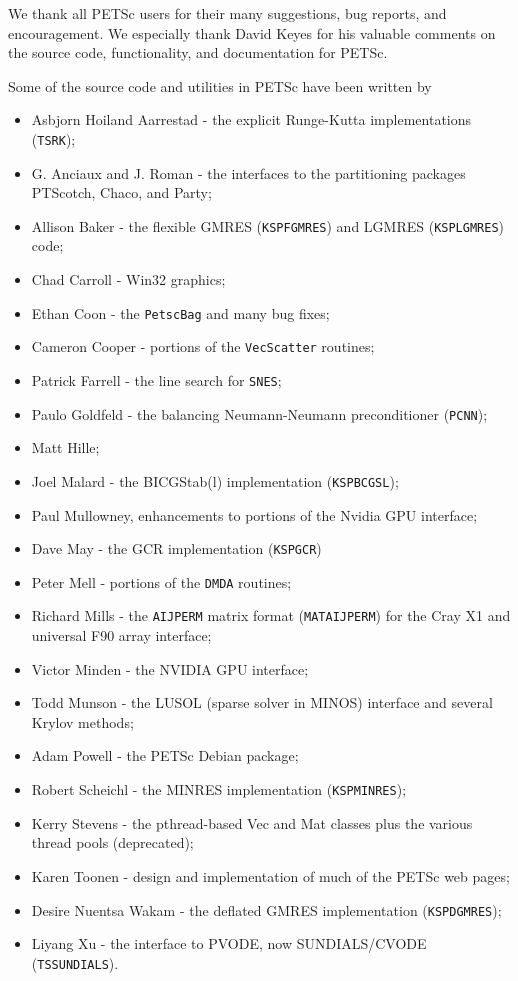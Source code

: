 %
%

\medskip \medskip \noindent
We thank all PETSc users for their many suggestions, bug reports, and
encouragement.  We especially thank David Keyes
for his valuable comments on the source code,
functionality, and documentation for PETSc.


\vspace{.3in}
\noindent
Some of the source code and utilities in PETSc
have been written by
\begin{itemize}
  \item Asbjorn Hoiland Aarrestad - the explicit Runge-Kutta implementations (\lstinline{TSRK});
  \item G. Anciaux and J. Roman - the interfaces to the partitioning packages PTScotch, Chaco, and Party;
  \item Allison Baker - the flexible GMRES (\lstinline{KSPFGMRES}) and LGMRES (\lstinline{KSPLGMRES}) code;
  \item Chad Carroll - Win32 graphics;
  \item Ethan Coon - the \lstinline{PetscBag} and many bug fixes;
  \item Cameron Cooper - portions of the \lstinline{VecScatter} routines;
  \item Patrick Farrell - the  line search for \lstinline{SNES};
  \item Paulo Goldfeld - the balancing Neumann-Neumann preconditioner (\lstinline{PCNN});
  \item Matt Hille;
  \item Joel Malard - the BICGStab(l) implementation (\lstinline{KSPBCGSL});
  \item Paul Mullowney, enhancements to portions of the Nvidia GPU interface;
  \item Dave May - the GCR implementation (\lstinline{KSPGCR})
  \item Peter Mell - portions of the \lstinline{DMDA} routines;
  \item Richard Mills - the \lstinline{AIJPERM} matrix format (\lstinline{MATAIJPERM}) for the Cray X1 and universal F90 array interface;
  \item Victor Minden - the NVIDIA GPU interface;
  \item Todd Munson - the LUSOL (sparse solver in MINOS) interface and several Krylov methods;
  \item Adam Powell - the PETSc Debian package;
  \item Robert Scheichl - the MINRES implementation (\lstinline{KSPMINRES});
  \item Kerry Stevens - the pthread-based Vec and Mat classes plus the various thread pools (deprecated);
  \item Karen Toonen - design and implementation of much of the PETSc web pages;
  \item Desire Nuentsa Wakam - the deflated GMRES implementation (\lstinline{KSPDGMRES});
  \item Liyang Xu - the interface to PVODE, now SUNDIALS/CVODE (\lstinline{TSSUNDIALS}).
\end{itemize}

